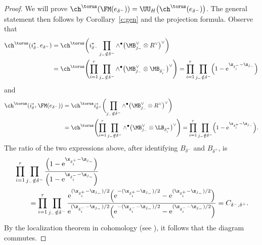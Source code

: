 \begin{proof}
We will prove
$\ch^\torus(\FM(e_{\delta^-})) = \UU_H \bigl( \ch^\torus(e_{\delta^-})\bigr)$.
 The general statement then follows by Corollary~\ref{c:gen} and the projection formula.
Observe that
\begin{align*}
\ch^\torus( i_{\delta^-}^* e_{\delta^-}) &=\ch^\torus\biggl( i_{\delta^-}^* \prod_{j_- \notin \delta^-} \wedge^\bullet \bigl(\MB_{j_-}^\vee \otimes R^\vee\bigr)^\vee \biggr)
\\
& =\ch^\torus\Biggl( \prod_{i=1}^r \prod_{j_- \notin \delta^-} \wedge^\bullet \bigl(\MB_{j_-}^\vee \otimes \MB_{\delta^-_i} \bigr)^\vee \Biggr)
=
\prod_{i=1}^r \prod_{j_- \notin \delta^-} \Bigl( 1 - {\rm e}^{\z_{\delta^-_i} - \z_{j_-}}\Bigr)
\end{align*}
and
\begin{align*}
\ch^\torus( i_{\delta^+}^* \FM(e_{\delta^-} ))& = \ch^\torus i_{\delta^+}^*\biggl( \prod_{j_- \notin \delta^-} \wedge^\bullet \bigl(\MB_{j_-}^\vee \otimes R^\vee\bigr)^\vee
\biggr) \\
& =
\ch^\torus\Biggl( \prod_{i=1}^r \prod_{j_- \notin \delta^-} \wedge^\bullet \bigl(\MB_{j_-}^\vee \otimes \LB_{\delta^+_i} \bigr)^\vee \Biggr)
=
\prod_{i=1}^r \prod_{j_- \notin \delta^-} \Bigl( 1 - {\rm e}^{\x_{\delta^+_i} - \z_{j_-}}\Bigr).
\end{align*}
The ratio of the two expressions above, after identifying $B_{\delta^-}$ and $B_{\delta^+}$, is
\begin{align*}
& \prod_{i=1}^r \prod_{j_- \notin \delta^-} \frac{\Bigl( 1 - {\rm e}^{\x_{\delta^+_i} - \z_{j_-}}\Bigr)}{\Bigl( 1 - {\rm e}^{\z_{\delta^-_i} - \z_{j_-}}\Bigr)} \\
&\qquad{}= \prod_{i=1}^r \prod_{j_- \notin \delta^-} \frac{ {\rm e}^{(\x_{\delta^+_i} - \z_{j_-})/2}\Bigl( {\rm e}^{-(\x_{\delta^+_i} - \z_{j_-})/2} - {\rm e}^{(\x_{\delta^+_i} - \z_{j_-})/2}\Bigr)}{ {\rm e}^{(\z_{\delta^-_i} - \z_{j_-})/2}\Bigl( {\rm e}^{-(\z_{\delta^-_i} - \z_{j_-})/2} - {\rm e}^{(\z_{\delta^-_i} - \z_{j_-})/2}\Bigr)}
= C_{\delta^-, \delta^+}.
\end{align*}
By the localization theorem in cohomology (see \cite{AB}), it follows that the diagram commutes.
\end{proof}

